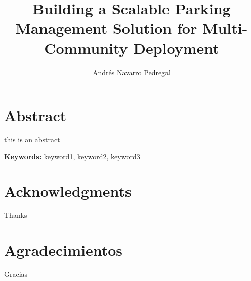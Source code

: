 \documentclass[oneside, 12pt, a4paper]{book}
\title{Building a Scalable Parking Management Solution for Multi-Community Deployment}
\author{Andrés Navarro Pedregal}
\begin{document}

\frontmatter
\maketitle

\blankpage%
\chapter*{Abstract}

this is an abstract

\textbf{Keywords:} keyword1, keyword2, keyword3

\blankpage%

\chapter*{Acknowledgments}
\begingroup
\let\clearpage\relax %

Thanks

\chapter*{Agradecimientos}

Gracias

\endgroup

\blankpage%

\renewcommand{\contentsname}{Table of Contents}
\tableofcontents

\blankpage%

\listoffigures

\blankpage%

\listoftables

\blankpage%

\printglossary[type=\acronymtype,style=long, title=LIST OF ACROYNMS]

\blankpage%

\mainmatter%























\blankpage%
\printbibliography%
\end{document}
